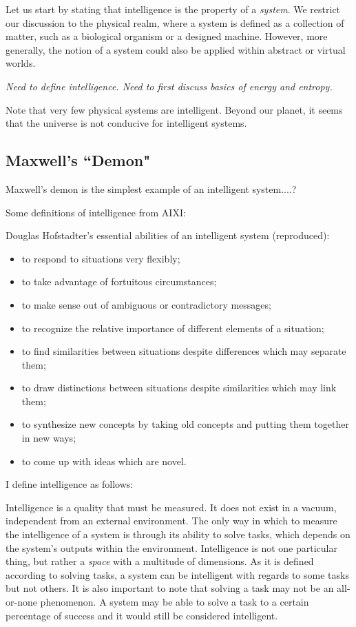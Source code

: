Let us start by stating that intelligence is the property of a \textit{system}. We restrict our discussion to the physical realm, where a system is defined as a collection of matter, such as a biological organism or a designed machine. However, more generally, the notion of a system could also be applied within abstract or virtual worlds. 

\textit{Need to define intelligence. Need to first discuss basics of energy and entropy.}

Note that very few physical systems are intelligent. Beyond our planet, it seems that the universe is not conducive for intelligent systems. 

\subsection{Maxwell's ``Demon"}

Maxwell's demon is the simplest example of an intelligent system....?

Some definitions of intelligence from AIXI: \cite{legg2007universal}

Douglas Hofstadter's \cite{hofstadter1980godel} essential abilities of an intelligent system (reproduced):
\begin{itemize}
    \item to respond to situations very flexibly;
    \item to take advantage of fortuitous circumstances;
    \item to make sense out of ambiguous or contradictory messages;
    \item to recognize the relative importance of different elements of a situation;
    \item to find similarities between situations despite differences which may separate them;
    \item to draw distinctions between situations despite similarities which may link them;
    \item to synthesize new concepts by taking old concepts and putting them together in new ways;
    \item to come up with ideas which are novel.
\end{itemize}

I define intelligence as follows:

Intelligence is a quality that must be measured. It does not exist in a vacuum, independent from an external environment. The only way in which to measure the intelligence of a system is through its ability to solve tasks, which depends on the system's outputs within the environment. Intelligence is not one particular thing, but rather a \textit{space} with a multitude of dimensions. As it is defined according to solving tasks, a system can be intelligent with regards to some tasks but not others. It is also important to note that solving a task may not be an all-or-none phenomenon. A system may be able to solve a task to a certain percentage of success and it would still be considered intelligent.

